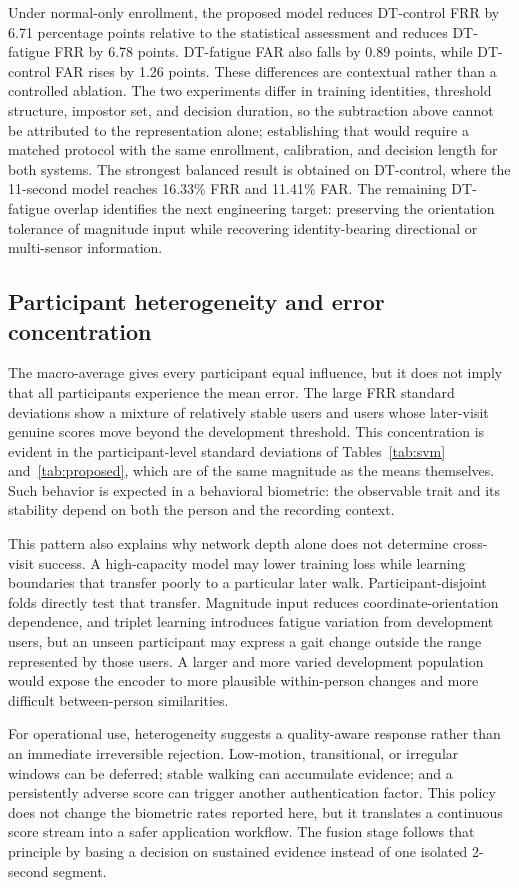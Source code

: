 \documentclass[conference]{IEEEtran}
\begin{document}
Under normal-only enrollment, the proposed model reduces DT-control FRR by 6.71 percentage points relative to the statistical assessment and reduces DT-fatigue FRR by 6.78 points. DT-fatigue FAR also falls by 0.89 points, while DT-control FAR rises by 1.26 points. These differences are contextual rather than a controlled ablation. The two experiments differ in training identities, threshold structure, impostor set, and decision duration, so the subtraction above cannot be attributed to the representation alone; establishing that would require a matched protocol with the same enrollment, calibration, and decision length for both systems. The strongest balanced result is obtained on DT-control, where the 11-second model reaches 16.33\% FRR and 11.41\% FAR. The remaining DT-fatigue overlap identifies the next engineering target: preserving the orientation tolerance of magnitude input while recovering identity-bearing directional or multi-sensor information.

\subsection{Participant heterogeneity and error concentration}
The macro-average gives every participant equal influence, but it does not imply that all participants experience the mean error. The large FRR standard deviations show a mixture of relatively stable users and users whose later-visit genuine scores move beyond the development threshold. This concentration is evident in the participant-level standard deviations of Tables~\ref{tab:svm} and~\ref{tab:proposed}, which are of the same magnitude as the means themselves. Such behavior is expected in a behavioral biometric: the observable trait and its stability depend on both the person and the recording context.

This pattern also explains why network depth alone does not determine cross-visit success. A high-capacity model may lower training loss while learning boundaries that transfer poorly to a particular later walk. Participant-disjoint folds directly test that transfer. Magnitude input reduces coordinate-orientation dependence, and triplet learning introduces fatigue variation from development users, but an unseen participant may express a gait change outside the range represented by those users. A larger and more varied development population would expose the encoder to more plausible within-person changes and more difficult between-person similarities.

For operational use, heterogeneity suggests a quality-aware response rather than an immediate irreversible rejection. Low-motion, transitional, or irregular windows can be deferred; stable walking can accumulate evidence; and a persistently adverse score can trigger another authentication factor. This policy does not change the biometric rates reported here, but it translates a continuous score stream into a safer application workflow. The fusion stage follows that principle by basing a decision on sustained evidence instead of one isolated 2-second segment.
\end{document}
